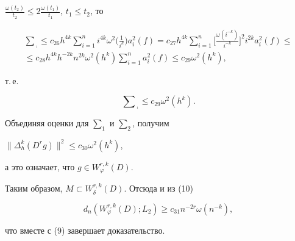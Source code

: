 \begin{pf}
$\frac{\omega(t_2)}{t_2}\le 2\frac{\omega(t_1)}{t_1}$, $t_1\le t_2$, то 


\begin{multline*} 


\sum{}_{{}_{{}_1}}\le c_{26}h^{4k}\sum^n_{i=1}i^{4k}\omega^2 


\bigg(\frac{1}{i^k} \bigg)a^2_i(f)=c_{27}h^{4k}\sum^n_{i=1} 


\bigg[\frac{\omega(i^{-k})}{i^{-k}} \bigg]^2 i^{2k}a^2_i(f)\le \\ 


% 


\le c_{28}h^{4k}h^{-2k}n^{2k}\omega^2(h^k)\sum^n_{i=1} 


a^2_i(f)\le c_{29}\omega^2(h^k), 


\end{multline*} 


т.\,е. 


$$ 


\sum{}_{{}_{{}_1}}\le c_{29}\omega^2(h^k). 


$$ 


Объединяя оценки для $\sum_1$ и $\sum_2$, получим 


$\|\Delta^k_h(D^r g)\|^2\le c_{30}\omega^2(h^k)$, 


а это означает, что $g\in W^{r,k}_\varphi(D)$. 


 


Таким образом, $M\subset W^{r,k}_\delta(D)$. Отсюда и из (10) 


$$ 


d_n(W^{r,k}_\varphi(D);L_2)\ge c_{31}n^{-2r}\omega(n^{-k}), 


$$ 


что вместе с (9) завершает доказательство. 


\end{pf} 


 



